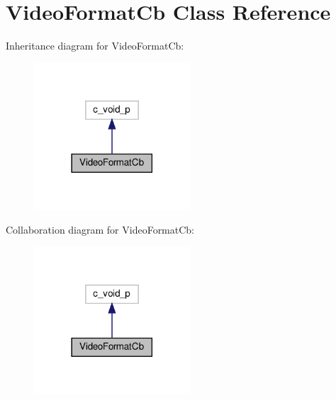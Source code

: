 \hypertarget{classvlc_1_1_video_format_cb}{}\section{Video\+Format\+Cb Class Reference}
\label{classvlc_1_1_video_format_cb}


Inheritance diagram for Video\+Format\+Cb\+:
\nopagebreak
\begin{figure}[H]
\begin{center}
\leavevmode
\includegraphics[width=165pt]{classvlc_1_1_video_format_cb__inherit__graph}
\end{center}
\end{figure}


Collaboration diagram for Video\+Format\+Cb\+:
\nopagebreak
\begin{figure}[H]
\begin{center}
\leavevmode
\includegraphics[width=165pt]{classvlc_1_1_video_format_cb__coll__graph}
\end{center}
\end{figure}


